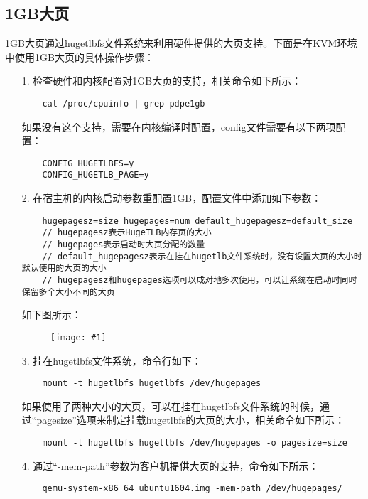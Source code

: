 \documentclass[a4paper,left=2.5cm,right=2.5cm,11pt]{article}
\newcommand{\fic}[1]{\begin{figure}[H]
		\center
		\texttt{[image: \#1]}
	\end{figure}}
\begin{document}
\subsection{1GB大页}
	1GB大页通过hugetlbfs文件系统来利用硬件提供的大页支持。下面是在KVM环境中使用1GB大页的具体操作步骤：
	\begin{itemize}
		\item[1.] 检查硬件和内核配置对1GB大页的支持，相关命令如下所示：
		\begin{lstlisting}
	cat /proc/cpuinfo | grep pdpe1gb
		\end{lstlisting}

		如果没有这个支持，需要在内核编译时配置，config文件需要有以下两项配置：
		\begin{lstlisting}
	CONFIG_HUGETLBFS=y
	CONFIG_HUGETLB_PAGE=y
		\end{lstlisting}

		\item[2.] 在宿主机的内核启动参数重配置1GB，配置文件中添加如下参数：
		\begin{lstlisting}
	hugepagesz=size hugepages=num default_hugepagesz=default_size
	// hugepagesz表示HugeTLB内存页的大小
	// hugepages表示启动时大页分配的数量
	// default_hugepagesz表示在挂在hugetlb文件系统时，没有设置大页的大小时默认使用的大页的大小
	// hugepagesz和hugepages选项可以成对地多次使用，可以让系统在启动时同时保留多个大小不同的大页
		\end{lstlisting}

		如下图所示：
		\fic{5.png}

		\item[3.] 挂在hugetlbfs文件系统，命令行如下：
		\begin{lstlisting}
	mount -t hugetlbfs hugetlbfs /dev/hugepages
		\end{lstlisting}

		如果使用了两种大小的大页，可以在挂在hugetlbfs文件系统的时候，通过“pagesize”选项来制定挂载hugetlbfs的大页的大小，相关命令如下所示：
		\begin{lstlisting}
	mount -t hugetlbfs hugetlbfs /dev/hugepages -o pagesize=size	
		\end{lstlisting}

		\item[4.] 通过“-mem-path”参数为客户机提供大页的支持，命令如下所示：
		\begin{lstlisting}
	qemu-system-x86_64 ubuntu1604.img -mem-path /dev/hugepages/
		\end{lstlisting}
	\end{itemize}
\end{document}
